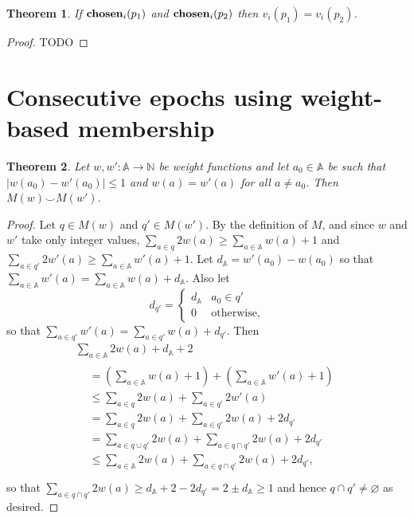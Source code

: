 \documentclass[journal]{IEEEtran}
\newtheorem{theorem}{Theorem}
\begin{document}
\begin{theorem}\label{paxos-safety-theorem} If $\mathbf{chosen}_{i}(p_1)$ and
$\mathbf{chosen}_{i}(p_2)$ then $v_i(p_1) = v_i(p_2)$.  \end{theorem}

\begin{proof}TODO\end{proof}

\section{Consecutive epochs using weight-based membership}

\begin{theorem} \label{weights-nearly-equal} Let $w, w' : \mathbb A \to \mathbb
N$ be weight functions and let $a_0 \in \mathbb A$ be such that $|w(a_0) -
w'(a_0)| \le 1$ and $w(a) = w'(a)$ for all $a \ne a_0$. Then $M(w) \smile
M(w')$.  \end{theorem}

\begin{proof} Let $q \in M(w)$ and $q' \in M(w')$. By the
  definition of $M$, and since $w$ and $w'$ take only integer values,
%
$\sum_{a \in q} 2 w(a) \ge \sum_{a \in \mathbb A} w(a) + 1$
%
and
%
$\sum_{a \in q'} 2 w'(a) \ge \sum_{a \in \mathbb A} w'(a) + 1$.
%
Let $d_{\mathbb A} = w'(a_0) - w(a_0)$ so that $\sum_{a \in \mathbb A} w'(a) =
\sum_{a \in \mathbb A} w(a) + d_{\mathbb A}$. Also let \[
d_{q'} =
\begin{cases}
%
d_{\mathbb A} & a_0 \in q' \\
%
0 & \textrm{otherwise,}
%
\end{cases}
\]
so that $\sum_{a \in q'} w'(a) = \sum_{a \in q'} w(a) + d_{q'}$.
%
Then
\begin{gather*}
%
\sum_{a \in \mathbb A} 2w(a) + d_{\mathbb A} + 2 \\
%
\begin{aligned}
%
&= \left( \sum_{a \in \mathbb A} w(a)  + 1\right)
+  \left( \sum_{a \in \mathbb A} w'(a) + 1\right) \\
%
&\le \sum_{a \in q}  2w(a)
+    \sum_{a \in q'} 2w'(a) \\
%
&= \sum_{a \in q}  2w(a)
+  \sum_{a \in q'} 2w(a) + 2d_{q'}\\
%
&= \sum_{a \in q \cup q'} 2w(a)
+  \sum_{a \in q \cap q'} 2w(a) + 2d_{q'}\\
%
&\le \sum_{a \in \mathbb A} 2w(a)
+    \sum_{a \in q \cap q'} 2w(a) + 2d_{q'},\\
%
\end{aligned}\end{gather*} so that $\sum_{a \in q \cap q'} 2w(a) \ge d_{\mathbb
A} + 2 - 2d_{q'} = 2 \pm d_\mathbb A \ge 1$ and hence $q \cap q' \ne \varnothing$ as desired.
\end{proof}
\end{document}
